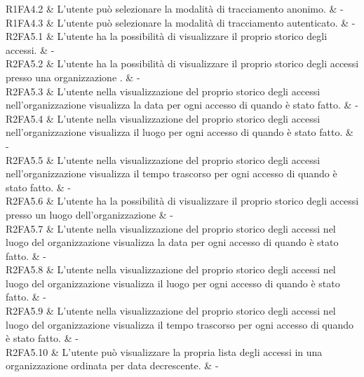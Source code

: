 R1FA4.2 & L’utente può selezionare la modalità di tracciamento anonimo. & - \\

R1FA4.3 & L’utente può selezionare la modalità di tracciamento autenticato. & - \\

R2FA5.1 & L’utente ha la possibilità di visualizzare il proprio storico degli accessi.  & - \\

R2FA5.2 & L’utente ha la possibilità di visualizzare il proprio storico degli accessi presso una organizzazione .  & - \\

R2FA5.3 & L'utente nella visualizzazione del proprio storico degli accessi nell'organizzazione visualizza la data per ogni accesso di quando è stato fatto. & - \\

R2FA5.4 & L'utente nella visualizzazione del proprio storico degli accessi nell'organizzazione visualizza il luogo per ogni accesso di quando è stato fatto.  & - \\

R2FA5.5 & L'utente nella visualizzazione del proprio storico degli accessi nell'organizzazione visualizza il tempo trascorso per ogni accesso di quando è stato fatto.  & - \\

R2FA5.6 & L’utente ha la possibilità di visualizzare il proprio storico degli accessi presso un luogo dell’organizzazione & - \\

R2FA5.7 & L'utente nella visualizzazione del proprio storico degli accessi nel luogo del organizzazione visualizza la data per ogni accesso di quando è stato fatto.  & - \\

R2FA5.8 & L'utente nella visualizzazione del proprio storico degli accessi nel luogo del organizzazione visualizza il luogo per ogni accesso di quando è stato fatto.  & - \\

R2FA5.9 & L'utente nella visualizzazione del proprio storico degli accessi nel luogo del organizzazione visualizza il tempo trascorso per ogni accesso di quando è stato fatto.  & - \\

R2FA5.10 & L’utente può visualizzare la propria lista degli accessi in una organizzazione ordinata per data decrescente.  & - \\

